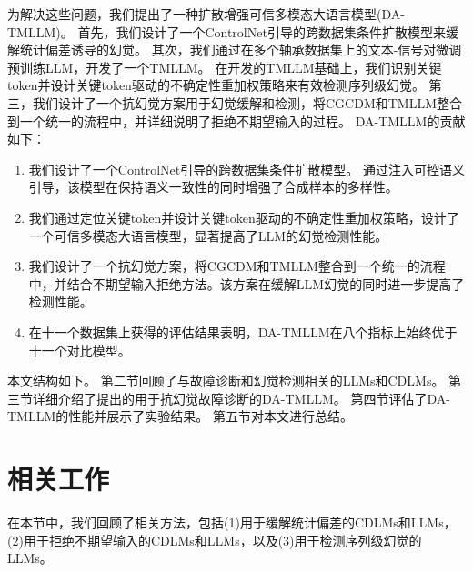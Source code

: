 \documentclass[UTF8,lettersize,journal]{IEEEtran}
\begin{document}
为解决这些问题，我们提出了一种扩散增强可信多模态大语言模型(DA-TMLLM)。
首先，我们设计了一个ControlNet引导的跨数据集条件扩散模型来缓解统计偏差诱导的幻觉。
其次，我们通过在多个轴承数据集上的文本-信号对微调预训练LLM，开发了一个TMLLM。
在开发的TMLLM基础上，我们识别关键token并设计关键token驱动的不确定性重加权策略来有效检测序列级幻觉。
第三，我们设计了一个抗幻觉方案用于幻觉缓解和检测，将CGCDM和TMLLM整合到一个统一的流程中，并详细说明了拒绝不期望输入的过程。 %
DA-TMLLM的贡献如下：
\begin{enumerate}[] 
	\item[1)] 我们设计了一个ControlNet引导的跨数据集条件扩散模型。
	通过注入可控语义引导，该模型在保持语义一致性的同时增强了合成样本的多样性。
	\item[2)] 我们通过定位关键token并设计关键token驱动的不确定性重加权策略，设计了一个可信多模态大语言模型，显著提高了LLM的幻觉检测性能。
	\item[3)] 我们设计了一个抗幻觉方案，将CGCDM和TMLLM整合到一个统一的流程中，并结合不期望输入拒绝方法。该方案在缓解LLM幻觉的同时进一步提高了检测性能。
	\item[4)] 在十一个数据集上获得的评估结果表明，DA-TMLLM在八个指标上始终优于十一个对比模型。
\end{enumerate}

本文结构如下。
第二节回顾了与故障诊断和幻觉检测相关的LLMs和CDLMs。
第三节详细介绍了提出的用于抗幻觉故障诊断的DA-TMLLM。
第四节评估了DA-TMLLM的性能并展示了实验结果。
第五节对本文进行总结。

\section{相关工作}
在本节中，我们回顾了相关方法，包括(1)用于缓解统计偏差的CDLMs和LLMs，(2)用于拒绝不期望输入的CDLMs和LLMs，以及(3)用于检测序列级幻觉的LLMs。
\end{document}
